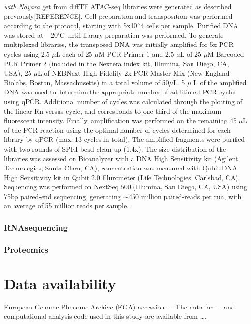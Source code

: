 \documentclass[11pt, a4paper, twosided]{book}
\begin{document}
\emph{with Nayara} get from diffTF
ATAC-seq libraries were generated as described previously{[}REFERENCE{]}. Cell preparation and transposition was performed according to the protocol, starting with 5x10ˆ4 cells per sample. Purified DNA was stored at −20\(^\circ\)C until library preparation was performed. To generate multiplexed libraries, the transposed DNA was initially amplified for 5x PCR cycles using 2.5 \(\mu\)L each of 25 \(\mu\)M PCR Primer 1 and 2.5 \(\mu\)L of 25 \(\mu\)M Barcoded PCR Primer 2 (included in the Nextera index kit, Illumina, San Diego, CA, USA), 25 \(\mu\)L of NEBNext High-Fidelity 2x PCR Master Mix (New England Biolabs, Boston, Massachusetts) in a total volume of 50\(\mu\)L. 5 \(\mu\) L of the amplified DNA was used to determine the appropriate number of additional PCR cycles using qPCR. Additional number of cycles was calculated through the plotting of the linear Rn versus cycle, and corresponds to one-third of the maximum fluorescent intensity. Finally, amplification was performed on the remaining 45 \(\mu\)L of the PCR reaction using the optimal number of cycles determined for each library by qPCR (max. 13 cycles in total). The amplified fragments were purified with two rounds of SPRI bead clean-up (1.4x). The size distribution of the libraries was assessed on Bioanalyzer with a DNA High Sensitivity kit (Agilent Technologies, Santa Clara, CA), concentration was measured with Qubit DNA High Sensitivity kit in Qubit 2.0 Flurometer (Life Technologies, Carlsbad, CA). Sequencing was performed on NextSeq 500 (Illumina, San Diego, CA, USA) using 75bp paired-end sequencing, generating ∼450 million paired-reads per run, with an average of 55 million reads per sample.

\hypertarget{rnasequencing}{%
\subsection{RNAsequencing}\label{rnasequencing}}

\hypertarget{proteomics}{%
\subsection{Proteomics}\label{proteomics}}

\hypertarget{data-availability}{%
\chapter{Data availability}\label{data-availability}}

European Genome-Phenome Archive (EGA) accession \ldots. The data for \ldots. and computational analysis code used in this study are available from \ldots.
\end{document}
